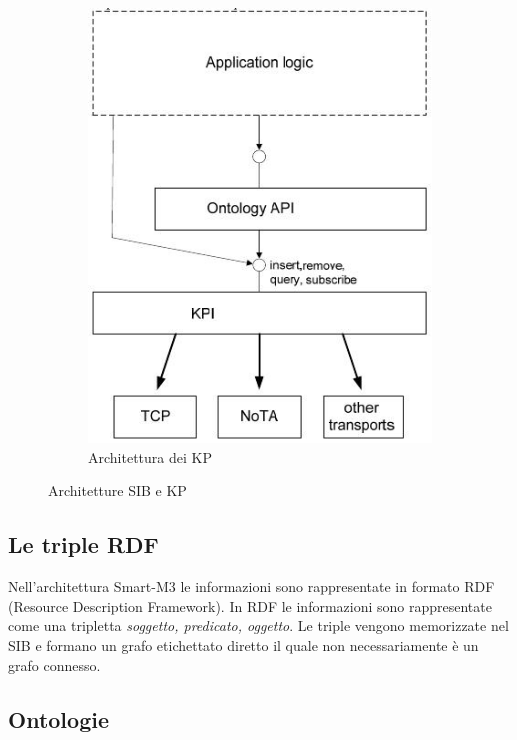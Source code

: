\begin{figure}[H]
\begin{subfigure}[H]{0.42\textwidth}
                \includegraphics[width=\textwidth]{assets/kp-architecture.jpg}
                \caption{Architettura dei KP}
                \label{fig:kp-architecture}
        \end{subfigure}
        \caption{Architetture SIB e KP}
\end{figure}

\subsection{Le triple RDF}

Nell'architettura Smart-M3 le informazioni sono rappresentate in formato RDF (Resource Description Framework). In RDF le informazioni sono rappresentate come una tripletta \emph{soggetto, predicato, oggetto}. Le triple vengono memorizzate nel SIB e formano un grafo etichettato diretto il quale non necessariamente è un grafo connesso.

\subsection{Ontologie}

